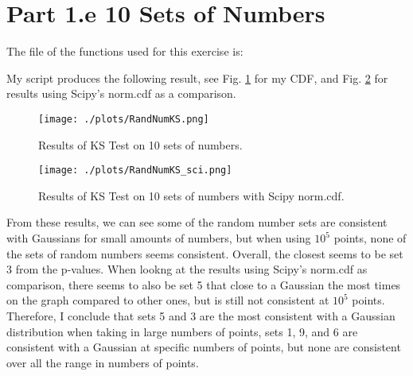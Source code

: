 \section{Part 1.e 10 Sets of Numbers}

The file of the functions used for this exercise is:



My script produces the following result, see Fig. \ref{fig:10_sets} for my CDF, and Fig. \ref{fig:10_sets_sci} for results using
Scipy's norm.cdf as a comparison.


\begin{figure}[h!]
  \centering
  \texttt{[image: ./plots/RandNumKS.png]}
  \caption{Results of KS Test on 10 sets of numbers.}
  \label{fig:10_sets}
\end{figure}

\begin{figure}[h!]
  \centering
  \texttt{[image: ./plots/RandNumKS\_sci.png]}
  \caption{Results of KS Test on 10 sets of numbers with Scipy norm.cdf.}
  \label{fig:10_sets_sci}
\end{figure}

From these results, we can see some of the random number sets are consistent with Gaussians for small amounts of numbers,
but when using $10^5$ points, none of the sets of random numbers seems consistent. Overall, the closest seems to be
set 3 from the p-values. When lookng at the results using Scipy's norm.cdf as comparison, there seems to also be set 5 that
close to a Gaussian the most times on the graph compared to other ones, but is still not consistent at $10^5$ points. Therefore,
I conclude that sets 5 and 3 are the most consistent with a Gaussian distribution when taking in large numbers of points, sets
1, 9, and 6 are consistent with a Gaussian at specific numbers of points, but none are consistent over all the range in numbers of points.

